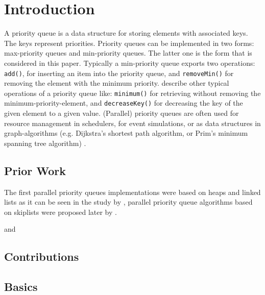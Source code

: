 
\section{Introduction}


A priority queue is a data structure for storing elements with associated keys. The keys represent priorities. Priority queues can be implemented in two forms: max-priority queues and min-priority queues. The latter one is the form that is considered in this paper.
Typically a min-priority queue exports two operations: \texttt{add()}, for inserting an item into the priority queue, and \texttt{removeMin()} for removing the element with the minimum priority. \citeauthor{cormen_introduction_2009} describe other typical operations of a priority queue like: \texttt{minimum()} for retrieving without removing the minimum-priority-element, and \texttt{decreaseKey()} for decreasing the key of the given element to a given value.
(Parallel) priority queues are often used for resource management in schedulers, for event simulations, or as data structures in graph-algorithms (e.g. Dijkstra's shortest path algorithm, or Prim's minimum spanning tree algorithm) \cite{cormen_introduction_2009}.

\subsection{Prior Work}

The first parallel priority queues implementations were based on heaps and linked lists as it can be seen in the study by \citeauthor{ronngren_comparative_1997} \cite{ronngren_comparative_1997}, parallel priority queue algorithms based on skiplists were proposed later by \citeauthor{shavit_scalable_1999} \cite{shavit_scalable_1999}.

\citeauthor{lotan_skiplist-based_2000} \cite{lotan_skiplist-based_2000} and \citeauthor{shavit_scalable_1999} \cite{shavit_scalable_1999}

\citeauthor{sundell_fast_2003} \cite{sundell_fast_2003}

\citeauthor{hendler_flat_2010} \cite{hendler_flat_2010}

\citeauthor{hendler_scalable_2004} \cite{hendler_scalable_2004}

\subsection{Contributions}

\subsection{Basics}


